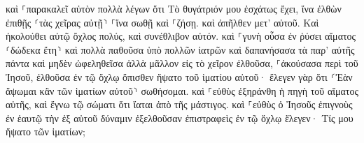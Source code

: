\documentclass{openreader}
\begin{document}
καὶ ⸀παρακαλεῖ αὐτὸν πολλὰ λέγων ὅτι Τὸ θυγάτριόν μου ἐσχάτως ἔχει, ἵνα ἐλθὼν ἐπιθῇς ⸂τὰς χεῖρας αὐτῇ⸃ ⸀ἵνα σωθῇ καὶ ⸀ζήσῃ. 
καὶ ἀπῆλθεν μετ’ αὐτοῦ. Καὶ ἠκολούθει αὐτῷ ὄχλος πολύς, καὶ συνέθλιβον αὐτόν. 
καὶ ⸀γυνὴ οὖσα ἐν ῥύσει αἵματος ⸂δώδεκα ἔτη⸃ 
καὶ πολλὰ παθοῦσα ὑπὸ πολλῶν ἰατρῶν καὶ δαπανήσασα τὰ παρ’ αὐτῆς πάντα καὶ μηδὲν ὠφεληθεῖσα ἀλλὰ μᾶλλον εἰς τὸ χεῖρον ἐλθοῦσα, 
⸀ἀκούσασα περὶ τοῦ Ἰησοῦ, ἐλθοῦσα ἐν τῷ ὄχλῳ ὄπισθεν ἥψατο τοῦ ἱματίου αὐτοῦ· 
ἔλεγεν γὰρ ὅτι ⸂Ἐὰν ἅψωμαι κἂν τῶν ἱματίων αὐτοῦ⸃ σωθήσομαι. 
καὶ ⸀εὐθὺς ἐξηράνθη ἡ πηγὴ τοῦ αἵματος αὐτῆς, καὶ ἔγνω τῷ σώματι ὅτι ἴαται ἀπὸ τῆς μάστιγος. 
καὶ ⸀εὐθὺς ὁ Ἰησοῦς ἐπιγνοὺς ἐν ἑαυτῷ τὴν ἐξ αὐτοῦ δύναμιν ἐξελθοῦσαν ἐπιστραφεὶς ἐν τῷ ὄχλῳ ἔλεγεν· Τίς μου ἥψατο τῶν ἱματίων; 
\end{document}
